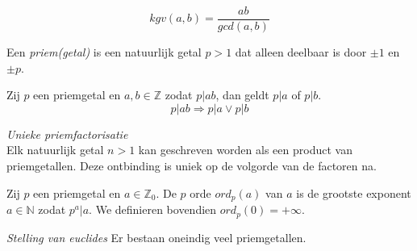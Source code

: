 \documentclass[main.tex]{subfiles}
\begin{document}
\begin{st}
  \[ kgv(a,b) = \frac{ab}{gcd(a,b)}\]

\end{st}

\begin{de}
  Een \emph{priem(getal)} is een natuurlijk getal $p > 1$ dat alleen deelbaar is door $\pm 1$ en $\pm p$.
\end{de}

\begin{st}
  Zij $p$ een priemgetal en $a,b \in \mathbb{Z}$ zodat $p|ab$, dan geldt $p|a$ of $p|b$.
  \[ p|ab \Rightarrow p|a \vee p|b \]

\end{st}

\begin{st}
  \emph{Unieke priemfactorisatie}\\
  Elk natuurlijk getal $n > 1$ kan geschreven worden als een product van priemgetallen.
  Deze ontbinding is uniek op de volgorde van de factoren na.

\end{st}

\begin{de}
  Zij $p$ een priemgetal en $a \in \mathbb{Z}_{0}$. De $p$ orde $ord_{p}(a)$ van $a$ is de grootste exponent $a\in \mathbb{N}$ zodat $p^{a}|a$. We definieren bovendien $ord_{p}(0) = +\infty$.
\end{de}

\begin{st}
  \emph{Stelling van euclides}
  Er bestaan oneindig veel priemgetallen.

\end{st}
\end{document}
